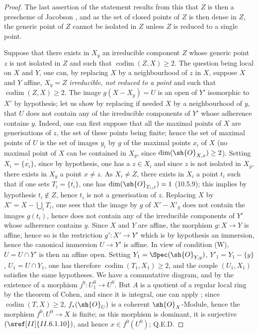 \begin{proof}
The last assertion of the statement results from this that $Z$ is then a prescheme of Jacobson , and as the set of closed points of $Z$ is then dense in $Z$, the generic point of $Z$ cannot be isolated in $Z$ unless $Z$ is reduced to a single point.

Suppose that there exists in $X_y$ an irreducible component $Z$ whose generic point $z$ is not isolated in $Z$ and such that $\operatorname{codim}(Z,X)\geq 2$.
The question being local on $X$ and $Y$, one can, by replacing $X$ by a neighbourhood of $z$ in $X$, suppose $X$ and $Y$ affine, $X_y=Z$ \emph{irreducible, not reduced to a point} and such that $\operatorname{codim}(Z,X)\geq 2$.
The image $g(X-X_y)=U$ is an open of $Y'$ isomorphic to $X'$ by hypothesis;
let us show by replacing if needed $X$ by a neighbourhood of $y$, that $U$ does not contain any of the irreducible components of $Y'$ whose adherence contains $y$.
Indeed, one can first suppose that all the maximal points of $X$ are generisations of $z$, the set of these points being finite;
hence the set of maximal points of $U$ is the set of images $y_i$ by $g$ of the maximal points $x_i$ of $X$ (no maximal point of $X$ can be contained in $X_y$, since $\dim(\sh{O}_{X,x})\geq 2$).
Setting $X_i=\overline{\{x_i\}}$, since by hypothesis, one has a $z\in X_i$ and since $z$ is not isolated in $X_y$, there exists in $X_y$ a point $x\neq z$.
As $X_i\neq Z$, there exists in $X_i$ a point $t_i$ such that if one sets $T_i=\overline{\{t_i\}}$, one has $\dim(\sh{O}_{T_i,z})=1$ (10.5.9);
this implies by hypothesis $t_i\notin Z$, hence $t_i$ is not a generisation of $z$.
Replacing $X$ by $X'=X-\bigcup_i T_i$, one sees that the image by $g$ of $X'-X'_y$ does not contain the images $g(t_i)$, hence does not contain any of the irreducible components of $Y'$ whose adherence contains $y$.
Since $X$ and $Y$ are affine, the morphism $g:X\to Y$ is affine, hence so is the restriction $g':X'\to Y'$ which is by hypothesis an immersion, hence the canonical immersion $U\to Y'$ is affine.
In view of condition (W), $U=U\cap Y'$ is then an affine open.
Setting $Y_1=\Spec(\sh{O}_{Y,y})$, $Y'_1=Y_1-\{y\}$, $U_1=U\cap Y_1$, one has therefore $\operatorname{codim}(T_1,X_1)\geq 2$, and the couple $(U_1,X_1)$ satisfies the same hypotheses.
We have a commutative diagram, and by  the existence of a morphism $j^0:U_1^0\to U^0$.
But $A$ is a quotient of a regular local ring by the theorem of Cohen, and since it is integral, one can apply ;
since $\operatorname{codim}(T,X)\geq 2$, $f_*(\sh{O}_U)$ is a coherent $\sh{O}_X$-Module, hence the morphism $f^0:U^0\to X$ is finite;
as this morphism is dominant, it is surjective $(\sref[II]{II.6.1.10})$, and hence $x\in f^0(U^0)$; Q.E.D.
\end{proof}

